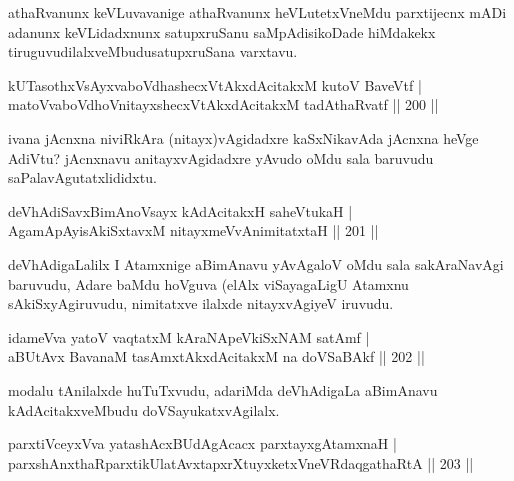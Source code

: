 \begin{artha}
athaRvanunx keVLuvavanige athaRvanunx heVLutetxVneMdu parxtijecnx mADi adanunx keVLidadxnunx satupxruSanu saMpAdisikoDade hiMdakekx tiruguvudilalxveMbudu\break	 satupxruSana varxtavu.
\end{artha}

\begin{shl}
kUTasothxV\s sAyxvaboVdhashecxVtAkxdAcitakxM kutoV BaveVtf |\\
matoV\s vaboVdhoV\s nitayxshecxVtAkxdAcitakxM tadA\s thaRvatf \hfill || 200 ||
\end{shl}

\begin{artha}
ivana jAcnxna niviRkAra (nitayx)vAgidadxre kaSxNikavAda jAcnxna heVge AdiVtu? jAcnxnavu anitayxvAgidadxre yAvudo oMdu sala baruvudu saPalavAgutatxlididxtu.
\end{artha}

\begin{shl}
deVhAdiSavxBimAnoV\s sayx kAdAcitakxH saheVtukaH |\\
AgamApAyisAkiSxtavxM nitayxmeVvAnimitatxtaH \hfill || 201 ||
\end{shl}


\begin{artha}
deVhAdigaLalilx I Atamxnige aBimAnavu yAvAgaloV oMdu sala sakAraNavAgi baruvudu, Adare baMdu hoVguva (elAlx viSayagaLigU Atamxnu sAkiSxyAgiruvudu, nimitatxve ilalxde nitayxvAgiyeV iruvudu.
\end{artha}

\begin{shl}
idameVva yatoV vaqtatxM kAraNApeVkiSxNAM satAmf |\\
aBUtAvx BavanaM tasAmxtAkxdAcitakxM na doVSaBAkf \hfill || 202 ||
\end{shl}


\begin{artha}
modalu tAnilalxde huTuTxvudu, adariMda deVhAdigaLa aBimAnavu kAdAcitakxveMbudu doVSayukatxvAgilalx.
\end{artha}

\begin{shl}
parxtiVceyxVva yatashAcxBUdAgAcacx parxtayxgAtamxnaH |\\
parxshAnxthaRparxtikUlatAvxtapxrXtuyxketxVneVRdaqgathaRtA \hfill || 203 ||
\end{shl}

